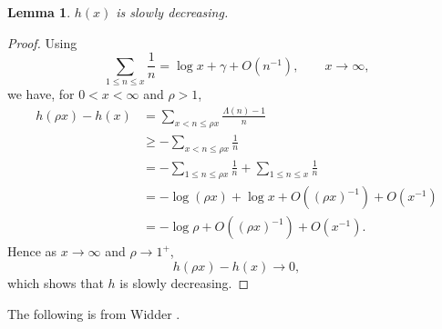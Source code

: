 \documentclass{amsart}
\newtheorem{lemma}[theorem]{Lemma}
\begin{document}
\begin{lemma}
$h(x)$ is slowly decreasing.
\end{lemma}
\begin{proof}
Using
\[
\sum_{1 \leq n \leq x} \frac{1}{n} = \log x + \gamma + O(n^{-1}), \qquad x \to \infty,
\]
we have, for $0<x<\infty$ and $\rho>1$,
\begin{align*}
h(\rho x)-h(x)&=\sum_{x<n \leq \rho x} \frac{\Lambda(n)-1}{n}\\
&\geq -\sum_{x<n \leq \rho x} \frac{1}{n}\\
&=-\sum_{1 \leq n \leq \rho x} \frac{1}{n} + \sum_{1 \leq n \leq x} \frac{1}{n}\\
&=-\log(\rho x) +  \log x + O((\rho x)^{-1})  + O(x^{-1})\\
&=-\log \rho + O((\rho x)^{-1})  + O(x^{-1}).
\end{align*}
Hence as $x \to \infty$ and $\rho \to 1^+$, 
\[
h(\rho x)-h(x) \to 0,
\]
which shows that $h$ is slowly decreasing.
\end{proof}



The following is from Widder \cite[pp.~231--232]{widder}.
\end{document}
